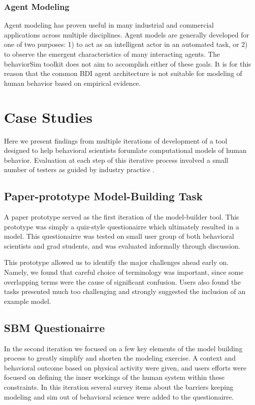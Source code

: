\documentclass[conference]{IEEEtran}
\begin{document}
\subsubsection{Agent Modeling}
Agent modeling has proven useful in many industrial and commercial applications across multiple disciplines. 
Agent models are generally developed for one of two purposes: 1) to act as an intelligent actor in an automated task, or 2) to observe the emergent characteristics of many interacting agents. 
The behaviorSim toolkit does not aim to accomplish either of these goals. 
It is for this reason that the common BDI agent architecture is not suitable for modeling of human behavior based on empirical evidence. 




\section{Case Studies}
Here we present findings from multiple iterations of development of a tool designed to help behavioral scientists forumlate computational models of human behavior.
Evaluation at each step of this iterative process involved a small number of testers as guided by industry practice \cite{nielsen2000}.

\subsection{Paper-prototype Model-Building Task}
A paper prototype served as the first iteration of the model-builder tool.
This prototype was simply a quiz-style questionairre which ultimately resulted in a model.
This questionairre was tested on small user group of both behavioral scientists and grad students, and was evaluated informally through discussion.

This prototype allowed us to identify the major challenges ahead early on.
Namely, we found that careful choice of terminology was important, since some overlapping terms were the cause of significant confusion.
Users also found the tasks presented much too challenging and strongly suggested the inclusion of an example model.
   
\subsection{SBM Questionairre}
In the second iteration we focused on a few key elements of the model building process to greatly simplify and shorten the modeling exercise.
A context and behavioral outcome based on physical activity were given, and users efforts were focused on defining the inner workings of the human system within these constraints.
In this iteration several survey items about the barriers keeping modeling and sim out of behavioral science were added to the questionairre.
\end{document}
